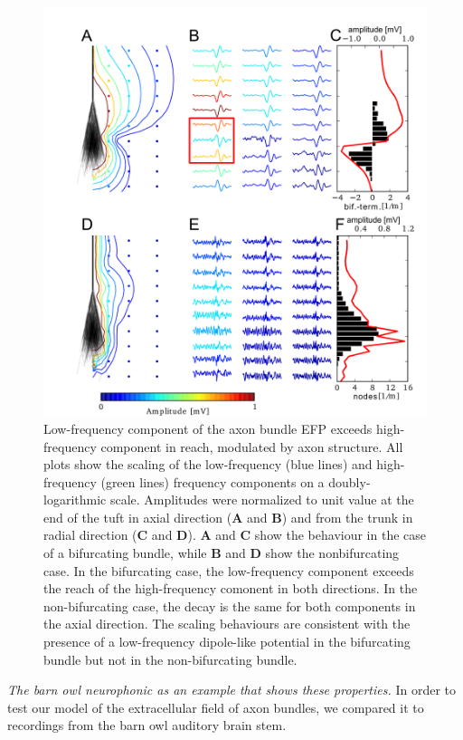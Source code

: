 \documentclass[]{article}
\begin{document}
\begin{figure}[htbp]
\centering
\includegraphics{../figs/fig_2.pdf}
\caption{Low-frequency component of the axon bundle EFP exceeds
high-frequency component in reach, modulated by axon structure. All
plots show the scaling of the low-frequency (blue lines) and
high-frequency (green lines) frequency components on a
doubly-logarithmic scale. Amplitudes were normalized to unit value at
the end of the tuft in axial direction (\textbf{A} and \textbf{B}) and
from the trunk in radial direction (\textbf{C} and \textbf{D}).
\textbf{A} and \textbf{C} show the behaviour in the case of a
bifurcating bundle, while \textbf{B} and \textbf{D} show the
nonbifurcating case. In the bifurcating case, the low-frequency
component exceeds the reach of the high-frequency comonent in both
directions. In the non-bifurcating case, the decay is the same for both
components in the axial direction. The scaling behaviours are consistent
with the presence of a low-frequency dipole-like potential in the
bifurcating bundle but not in the non-bifurcating bundle.}
\end{figure}

\emph{The barn owl neurophonic as an example that shows these
properties.} In order to test our model of the extracellular field of
axon bundles, we compared it to recordings from the barn owl auditory
brain stem.
\end{document}
